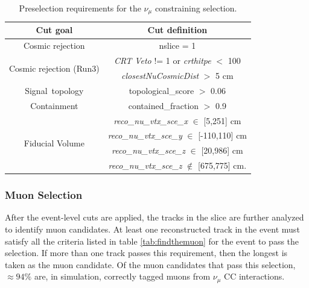 \begin{table}[h!]
\centering
\setlength{\tabcolsep}{10pt}
\renewcommand{\arraystretch}{1.25}
 \begin{tabular}{| c | c |} 
 \hline
 Cut goal & Cut definition \\
 \hline\hline
\multirow{1}{*}{ Cosmic rejection } & nslice = 1 \\
 \hline
\multirow{2}{*}{ Cosmic rejection (Run3) } & \emph{CRT Veto} != 1 or \emph{crthitpe} $<$ 100\\
& \emph{closestNuCosmicDist} $>$ 5 cm\\
 \hline
\multirow{1}{*}{Signal~topology} & topological\_score $>$ 0.06 \\
 \hline
Containment & contained\_fraction $>$ 0.9 \\
 \hline
 \multirow{4}{*}{Fiducial Volume} & \emph{reco\_nu\_vtx\_sce\_x} $\in$ [5,251] cm \\ &
\emph{reco\_nu\_vtx\_sce\_y} $\in$ [-110,110] cm \\ &
\emph{reco\_nu\_vtx\_sce\_z} $\in$ [20,986] cm \\ &
\emph{reco\_nu\_vtx\_sce\_z} $\not\in$ [675,775] cm.\\
 \hline
 \end{tabular}
 \caption{\label{tab:1muNp:presel} Preselection requirements for the $\nu_\mu$ constraining selection.}
\end{table}




\subsubsection{Muon Selection}
\label{sssec:NuMUCCsel:constr:muonsel}

\par After the event-level cuts are applied, the tracks in the slice are further analyzed to identify muon candidates. At least one reconstructed track in the event must satisfy all the criteria listed in table \ref{tab:findthemuon} for the event to pass the selection. If more than one track passes this requirement, then the longest is taken as the muon candidate. Of the muon candidates that pass this selection, $\approx 94\%$ are, in simulation, correctly tagged muons from $\nu_{\mu}$ CC interactions.



